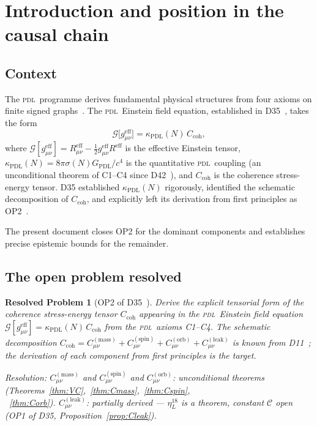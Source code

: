 \documentclass[12pt,a4paper]{article}
\newtheorem{resolvedproblem}{Resolved Problem}
\newcommand{\PDL}{\textsc{pdl}}
\newcommand{\Ccoh}{C_{\mathrm{coh}}}
\newcommand{\Cmass}{C^{(\mathrm{mass})}}
\newcommand{\Cspin}{C^{(\mathrm{spin})}}
\newcommand{\Corb}{C^{(\mathrm{orb})}}
\newcommand{\Cleak}{C^{(\mathrm{leak})}}
\newcommand{\sig}{\sigma}
\newcommand{\kPDL}{\kappa_{\mathrm{PDL}}}
\newcommand{\GPDL}{G_{\mathrm{PDL}}}
\newcommand{\geff}{g_{\mu\nu}^{\mathrm{eff}}}
\newcommand{\etaL}{\eta_L}
\begin{document}
\clearpage

\tableofcontents
\newpage

\section{Introduction and position in the causal chain}
\label{sec:intro}

\subsection{Context}

The \PDL\ programme derives fundamental physical structures from four axioms on finite signed graphs~\cite{PDL_D01_2026,PDL_D02_2026}. The \PDL\ Einstein field equation, established in D35~\cite{PDL_D35_2026}, takes the form
\begin{equation}
\mathcal{G}\bigl[\geff\bigr] = \kPDL(N)\,\Ccoh,
\label{eq:Einstein_PDL}
\end{equation}
where $\mathcal{G}[\geff] = R_{\mu\nu}^{\mathrm{eff}} - \tfrac{1}{2}\geff R^{\mathrm{eff}}$ is the effective Einstein tensor, $\kPDL(N) = 8\pi\sig(N)\GPDL/c^4$ is the quantitative \PDL\ coupling (an unconditional theorem of C1--C4 since D42~\cite{PDL_D42_2026}), and $\Ccoh$ is the coherence stress-energy tensor. D35 established $\kPDL(N)$ rigorously, identified the schematic decomposition of $\Ccoh$, and explicitly left its derivation from first principles as OP2~\cite{PDL_D35_2026}.

The present document closes OP2 for the dominant components and establishes precise epistemic bounds for the remainder.

\subsection{The open problem resolved}

\begin{resolvedproblem}[OP2 of D35~{\cite{PDL_D35_2026}}]
\label{rp:OP2}
Derive the explicit tensorial form of the coherence stress-energy tensor $\Ccoh$ appearing in the \PDL\ Einstein field equation $\mathcal{G}[\geff] = \kPDL(N)\,\Ccoh$ from the \PDL\ axioms C1--C4. The schematic decomposition $\Ccoh = \Cmass_{\mu\nu} + \Cspin_{\mu\nu} + \Corb_{\mu\nu} + \Cleak_{\mu\nu}$ is known from D11~\cite{PDL_D11_2026}; the derivation of each component from first principles is the target.

\emph{Resolution:} $\Cmass_{\mu\nu}$ and $\Cspin_{\mu\nu}$ and $\Corb_{\mu\nu}$: unconditional theorems (Theorems~\ref{thm:VC},~\ref{thm:Cmass},~\ref{thm:Cspin}, \\ ~\ref{thm:Corb}). $\Cleak_{\mu\nu}$: partially derived --- $\etaL^{18}$ is a theorem, constant $\mathcal{C}$ open (OP1 of D35, Proposition~\ref{prop:Cleak}).
\end{resolvedproblem}
\end{document}
